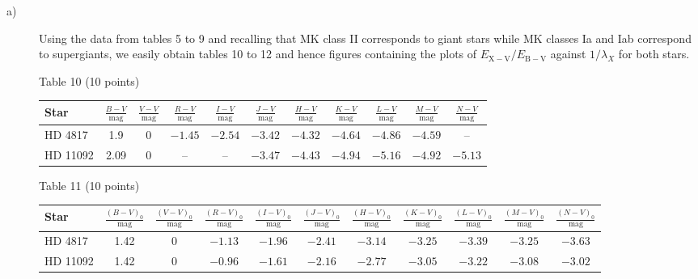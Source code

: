 \begin{description}
\item[a)] Using the data from tables 5 to 9 and recalling that MK class II
  corresponds to giant stars while MK classes Ia and Iab correspond to
  supergiants, we easily obtain tables 10 to 12 and hence figures containing
  the plots of $E_{\mathrm{X-V}}/E_{\mathrm{B-V}}$ against $1/\lambda_X$ for
  both stars.

  \begin{center}
  Table 10 (10 points)

  \begin{tabular}{|l|c|c|c|c|c|c|c|c|c|c|}
  \hline
  Star & $\frac{B-V}{\mathrm{mag}}$ & $\frac{V-V}{\mathrm{mag}}$
    & $\frac{R-V}{\mathrm{mag}}$ & $\frac{I-V}{\mathrm{mag}}$
    & $\frac{J-V}{\mathrm{mag}}$ & $\frac{H-V}{\mathrm{mag}}$
    & $\frac{K-V}{\mathrm{mag}}$ & $\frac{L-V}{\mathrm{mag}}$
    & $\frac{M-V}{\mathrm{mag}}$ & $\frac{N-V}{\mathrm{mag}}$\\
  \hline
  HD 4817 & 1.9 & 0 & $-1.45$ & $-2.54$ & $-3.42$ & $-4.32$ & $-4.64$
    & $-4.86$ & $-4.59$ & --\\
  \hline
  HD 11092 & 2.09 & 0 & -- & -- & $-3.47$ & $-4.43$ & $-4.94$ & $-5.16$
    & $-4.92$ & $-5.13$\\
  \hline
  \end{tabular}
  \end{center}

  \begin{center}
  Table 11 (10 points)

  \begin{tabular}{|l|c|c|c|c|c|c|c|c|c|c|}
  \hline
  Star & $\frac{(B-V)_0}{\mathrm{mag}}$ & $\frac{(V-V)_0}{\mathrm{mag}}$
    & $\frac{(R-V)_0}{\mathrm{mag}}$ & $\frac{(I-V)_0}{\mathrm{mag}}$
    & $\frac{(J-V)_0}{\mathrm{mag}}$ & $\frac{(H-V)_0}{\mathrm{mag}}$
    & $\frac{(K-V)_0}{\mathrm{mag}}$ & $\frac{(L-V)_0}{\mathrm{mag}}$
    & $\frac{(M-V)_0}{\mathrm{mag}}$ & $\frac{(N-V)_0}{\mathrm{mag}}$\\
  \hline
  HD 4817 & 1.42 & 0 & $-1.13$ & $-1.96$ & $-2.41$ & $-3.14$ & $-3.25$
    & $-3.39$ & $-3.25$ & $-3.63$\\
  \hline
  HD 11092 & 1.42 & 0 & $-0.96$ & $-1.61$ & $-2.16$ & $-2.77$ & $-3.05$
    & $-3.22$ & $-3.08$ & $-3.02$\\
  \hline
  \end{tabular}
  \end{center}


\end{description}
